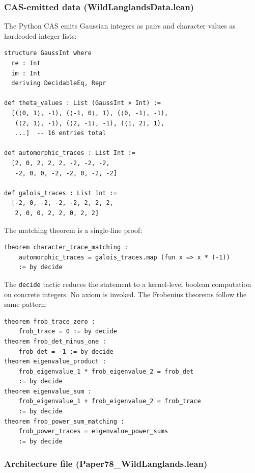 \documentclass[11pt]{article}
\theoremstyle{plain}
\theoremstyle{definition}
\theoremstyle{remark}
\begin{document}
\subsubsection*{CAS-emitted data (WildLanglandsData.lean)}

The Python CAS emits Gaussian integers as pairs and character
values as hardcoded integer lists:
\begin{lstlisting}
structure GaussInt where
  re : Int
  im : Int
  deriving DecidableEq, Repr

def theta_values : List (GaussInt × Int) :=
  [(⟨0, 1⟩, -1), (⟨-1, 0⟩, 1), (⟨0, -1⟩, -1),
   (⟨2, 1⟩, -1), (⟨2, -1⟩, -1), (⟨1, 2⟩, 1),
   ...]  -- 16 entries total

def automorphic_traces : List Int :=
  [2, 0, 2, 2, 2, -2, -2, -2,
   -2, 0, 0, -2, -2, 0, -2, -2]

def galois_traces : List Int :=
  [-2, 0, -2, -2, -2, 2, 2, 2,
   2, 0, 0, 2, 2, 0, 2, 2]
\end{lstlisting}

The matching theorem is a single-line proof:
\begin{lstlisting}
theorem character_trace_matching :
    automorphic_traces = galois_traces.map (fun x => x * (-1))
    := by decide
\end{lstlisting}

The \texttt{decide} tactic reduces the statement to a
kernel-level boolean computation on concrete integers.  No
axiom is invoked.  The Frobenius theorems follow the same
pattern:
\begin{lstlisting}
theorem frob_trace_zero :
    frob_trace = 0 := by decide
theorem frob_det_minus_one :
    frob_det = -1 := by decide
theorem eigenvalue_product :
    frob_eigenvalue_1 * frob_eigenvalue_2 = frob_det
    := by decide
theorem eigenvalue_sum :
    frob_eigenvalue_1 + frob_eigenvalue_2 = frob_trace
    := by decide
theorem frob_power_sum_matching :
    frob_power_traces = eigenvalue_power_sums
    := by decide
\end{lstlisting}

\subsubsection*{Architecture file (Paper78\_WildLanglands.lean)}
\end{document}
